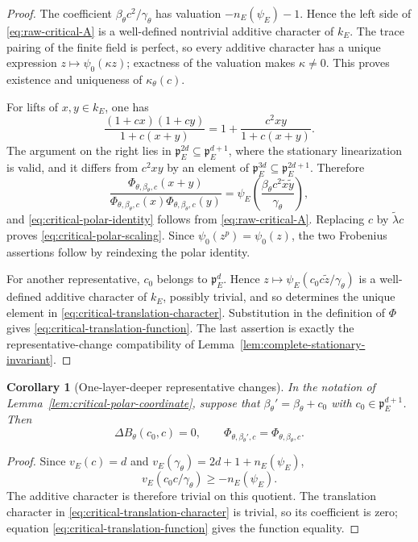 \documentclass[11pt]{amsart}
\newtheorem{corollary}[theorem]{Corollary}
\theoremstyle{definition}
\theoremstyle{remark}
\newcommand{\p}{\mathfrak p}
\begin{document}
\begin{proof}
The coefficient
$\beta_\theta c^2/\gamma_\theta$ has valuation
$-n_E(\psi_E)-1$.  Hence the left side of
\eqref{eq:raw-critical-A} is a well-defined nontrivial additive
character of $k_E$.  The trace pairing of the finite field is perfect,
so every additive character has a unique expression
$z\mapsto\psi_0(\kappa z)$; exactness of the valuation makes
$\kappa\ne0$.  This proves existence and uniqueness of
$\kappa_\theta(c)$.

For lifts of $x,y\in k_E$, one has
\[
 \frac{(1+cx)(1+cy)}{1+c(x+y)}
 =1+\frac{c^2xy}{1+c(x+y)}.
\]
The argument on the right lies in $\p_E^{2d}\subseteq\p_E^{d+1}$,
where the stationary linearization is valid, and it differs from
$c^2xy$ by an element of $\p_E^{3d}\subseteq\p_E^{2d+1}$.  Therefore
\[
 \frac{\Phi_{\theta,\beta_\theta,c}(x+y)}
      {\Phi_{\theta,\beta_\theta,c}(x)
       \Phi_{\theta,\beta_\theta,c}(y)}
 =\psi_E\!\left(
   \frac{\beta_\theta c^2\widetilde x\widetilde y}
        {\gamma_\theta}
 \right),
\]
and \eqref{eq:critical-polar-identity} follows from
\eqref{eq:raw-critical-A}.  Replacing $c$ by
$\widetilde\lambda c$ proves
\eqref{eq:critical-polar-scaling}.  Since
$\psi_0(z^p)=\psi_0(z)$, the two Frobenius assertions follow by
reindexing the polar identity.

For another representative, $c_0$ belongs to $\p_E^d$.  Hence
$z\mapsto\psi_E(c_0c\widetilde z/\gamma_\theta)$ is a well-defined
additive character of $k_E$, possibly trivial, and so determines the
unique element in \eqref{eq:critical-translation-character}.
Substitution in the definition of $\Phi$ gives
\eqref{eq:critical-translation-function}.  The last assertion is
exactly the representative-change compatibility of
Lemma~\ref{lem:complete-stationary-invariant}.
\end{proof}


\begin{corollary}[One-layer-deeper representative changes]
\label{cor:deep-representative-change}
In the notation of Lemma~\ref{lem:critical-polar-coordinate}, suppose
that $\beta_\theta'=\beta_\theta+c_0$ with
$c_0\in\p_E^{d+1}$.  Then
\[
 \Delta B_\theta(c_0,c)=0,
 \qquad
 \Phi_{\theta,\beta_\theta',c}
 =\Phi_{\theta,\beta_\theta,c}.
\]
\end{corollary}

\begin{proof}
Since $v_E(c)=d$ and
$v_E(\gamma_\theta)=2d+1+n_E(\psi_E)$,
\[
 v_E(c_0c/\gamma_\theta)\ge -n_E(\psi_E).
\]
The additive character is therefore trivial on this quotient.  The
translation character in
\eqref{eq:critical-translation-character} is trivial, so its coefficient
is zero; equation \eqref{eq:critical-translation-function} gives the
function equality.
\end{proof}
\end{document}
